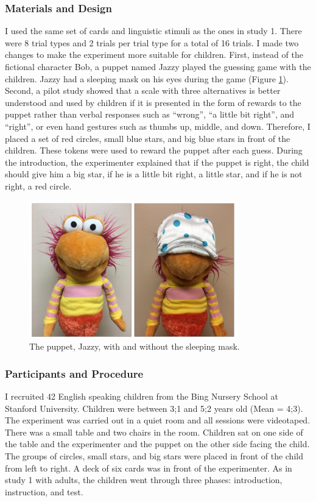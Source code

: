 \documentclass[oneside]{report}
\theoremstyle{definition}
\theoremstyle{definition}
\theoremstyle{definition}
\theoremstyle{remark}
\begin{document}
\subsubsection{Materials and Design}\label{materials-and-design-1}

I used the same set of cards and linguistic stimuli as the ones in study
1. There were 8 trial types and 2 trials per trial type for a total of
16 trials. I made two changes to make the experiment more suitable for
children. First, instead of the fictional character Bob, a puppet named
Jazzy played the guessing game with the children. Jazzy had a sleeping
mask on his eyes during the game (Figure \ref{fig:jazzy}). Second, a
pilot study showed that a scale with three alternatives is better
understood and used by children if it is presented in the form of
rewards to the puppet rather than verbal responses such as ``wrong'',
``a little bit right'', and ``right'', or even hand gestures such as
thumbs up, middle, and down. Therefore, I placed a set of red circles,
small blue stars, and big blue stars in front of the children. These
tokens were used to reward the puppet after each guess. During the
introduction, the experimenter explained that if the puppet is right,
the child should give him a big star, if he is a little bit right, a
little star, and if he is not right, a red circle.
\begin{figure}[tb]

{\centering \includegraphics{figs/jazzy-1} 

}

\caption{The puppet, Jazzy, with and without the sleeping mask.}\label{fig:jazzy}
\end{figure}
\subsubsection{Participants and
Procedure}\label{participants-and-procedure-1}

I recruited 42 English speaking children from the Bing Nursery School at
Stanford University. Children were between 3;1 and 5;2 years old (Mean =
4;3). The experiment was carried out in a quiet room and all sessions
were videotaped. There was a small table and two chairs in the room.
Children sat on one side of the table and the experimenter and the
puppet on the other side facing the child. The groups of circles, small
stars, and big stars were placed in front of the child from left to
right. A deck of six cards was in front of the experimenter. As in study
1 with adults, the children went through three phases: introduction,
instruction, and test.
\end{document}
